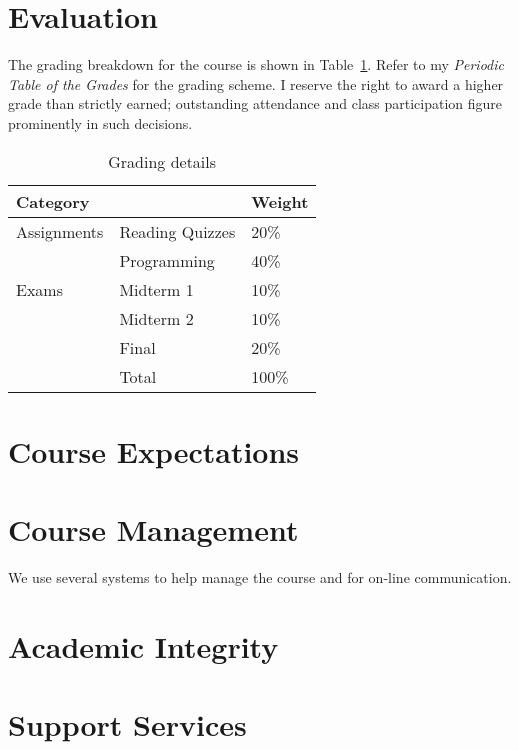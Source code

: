 \documentclass[11pt]{article}
\begin{document}


\section{Evaluation}

The grading breakdown for the course
is shown in Table~\ref{tab:grading}.
Refer to my \emph{Periodic Table of the Grades}
for the grading scheme.
I reserve the right to award a higher grade than strictly earned;
outstanding attendance and class participation
figure prominently in such decisions.

\begin{table}[htb]
  \centering
\begin{tabular}{lll}
\toprule
Category    &                 & Weight \\
\midrule
Assignments & Reading Quizzes & 20\%   \\
            & Programming     & 40\%   \\
Exams       & Midterm 1       & 10\%   \\
            & Midterm 2       & 10\%   \\
            & Final           & 20\%   \\
\midrule
            & Total           & 100\%  \\
\bottomrule
\end{tabular}
  \caption{Grading details}
  \label{tab:grading}
\end{table}
\begin{comment}
  #+ORGTBL: SEND grades orgtbl-to-latex :splice nil :skip 0 :booktabs t
  | Category    |                 | Weight |
  |-------------+-----------------+--------|
  | Assignments | Reading Quizzes |    20%
  |             | Programming     |    40%
  | Exams       | Midterm 1       |    10%
  |             | Midterm 2       |    10%
  |             | Final           |    20%
  |-------------+-----------------+--------|
  |             | Total           |   100%
  #+TBLFM: @7$3=100*vsum(@I..II);%
\end{comment}

\section{Course Expectations}



\section{Course Management}

We use several systems to help manage the course
and for on-line communication.





\section{Academic Integrity}



\section{Support Services}



\lastupdated

\end{document}
